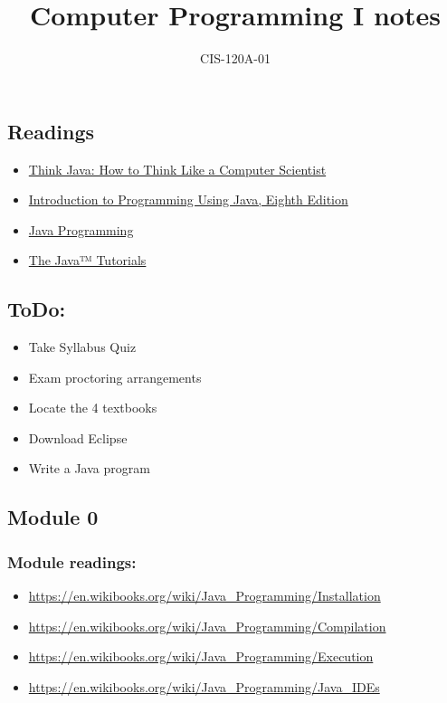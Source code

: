 \documentclass{article}
\title{Computer Programming I notes}
\author{CIS-120A-01}
\begin{document}
\maketitle

\tableofcontents

\subsection{Readings}

\begin{itemize}
        \item \href{https://www.stevenlrichardson.com/TJ2T/}{Think Java: How to Think Like a Computer Scientist}
        \item \href{https://www.stevenlrichardson.com/IPJ/}{Introduction to Programming Using Java, Eighth Edition}
        \item \href{https://en.wikibooks.org/wiki/Java_Programming}{Java Programming}
        \item \href{https://docs.oracle.com/javase/tutorial/}{The Java™ Tutorials}
\end{itemize}

\subsection{ToDo:}

\begin{itemize}
	\item Take Syllabus Quiz
	\item Exam proctoring arrangements
	\item Locate the 4 textbooks
	\item Download Eclipse
	\item Write a Java program
\end{itemize}

\subsection{Module 0}

\subsubsection{Module readings:}
\begin{itemize}
\item \url{https://en.wikibooks.org/wiki/Java_Programming/Installation}
\item \url{https://en.wikibooks.org/wiki/Java_Programming/Compilation}
\item \url{https://en.wikibooks.org/wiki/Java_Programming/Execution}
\item \url{https://en.wikibooks.org/wiki/Java_Programming/Java_IDEs}
\end{itemize}
\end{document}

